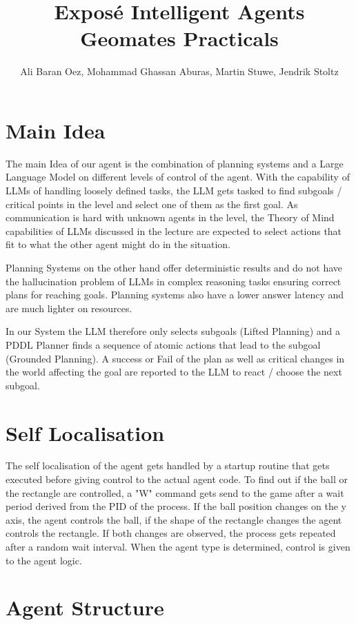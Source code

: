 \documentclass{article}
\title{Exposé Intelligent Agents Geomates Practicals}
\author{Ali Baran Oez, Mohammad Ghassan Aburas, Martin Stuwe, Jendrik Stoltz}
\begin{document}
\maketitle

\section{Main Idea}

The main Idea of our agent is the combination of planning systems and a Large Language Model on different levels of control of the agent. 
With the capability of LLMs of handling loosely defined tasks, the LLM gets tasked to find subgoals / critical points in the level and select one of them as the first goal. As communication is hard with unknown agents in the level,  the Theory of Mind capabilities of LLMs discussed in the lecture are expected to select actions that fit to what the other agent might do in the situation. 

Planning Systems on the other hand offer deterministic results and do not have the hallucination problem of LLMs in complex reasoning tasks ensuring correct plans for reaching goals. Planning systems also have a lower answer latency and are much lighter on resources. 

In our System the LLM therefore only selects subgoals (Lifted Planning) and a PDDL Planner finds a sequence of atomic actions that lead to the subgoal (Grounded Planning). A success or Fail of the plan as well as critical changes in the world affecting the goal are reported to the LLM to react / choose the next subgoal.

\section{Self Localisation}

The self localisation of the agent gets handled by a startup routine that gets executed before giving control to the actual agent code. To find out if the ball or the rectangle are controlled, a "W" command gets send to the game after a wait period derived from the PID of the process. If the ball position changes on the y axis, the agent controls the ball, if the shape of the rectangle changes the agent controls the rectangle. If both changes are observed, the process gets repeated after a random wait interval. When the agent type is determined, control is given to the agent logic.

\section{Agent Structure}
\end{document}
